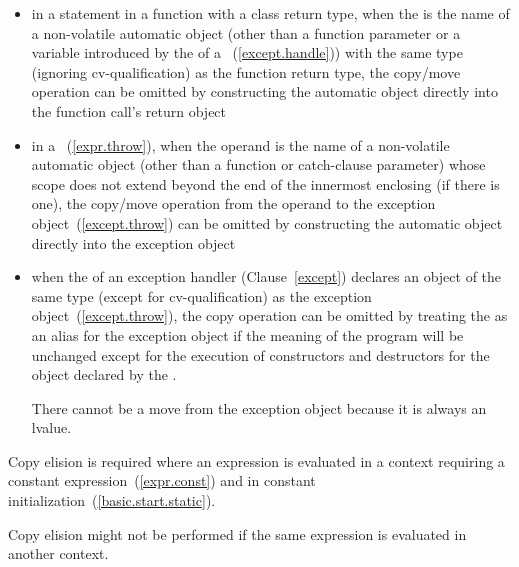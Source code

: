 \begin{itemize}
\item in a  statement in a function with a class return type,
when the  is the name of a non-volatile
automatic object (other than a function parameter or a variable
introduced by the  of a
~(\ref{except.handle}))
with the same type (ignoring cv-qualification) as
the function return type, the copy/move operation can be
omitted by constructing the automatic object directly
into the function call's return object

\item in a ~(\ref{expr.throw}), when the operand
is the name of a non-volatile automatic object
(other than a function or catch-clause parameter)
whose scope does not extend beyond the end of the innermost enclosing
 (if there is one), the copy/move operation from the
operand to the exception object~(\ref{except.throw}) can be omitted by
constructing the automatic object directly into the exception object

\item when the  of an
exception handler (Clause~\ref{except}) declares an object of the same
type (except for cv-qualification) as the exception
object~(\ref{except.throw}), the copy operation can be omitted by treating
the  as an alias for the exception
object if the meaning of the program will be unchanged except for the execution
of constructors and destructors for the object declared by the
.
\begin{note} There cannot be a move from the exception object because it is
always an lvalue.  \end{note}
\end{itemize}
Copy elision is required
where an expression is evaluated in a context
requiring a constant expression~(\ref{expr.const})
and in constant initialization~(\ref{basic.start.static}).
\begin{note}
Copy elision might not be performed
if the same expression
is evaluated in another context.
\end{note}

